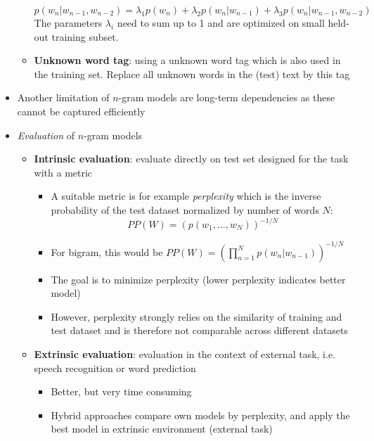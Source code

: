 \begin{itemize}
\begin{itemize}
		$$p(w_n|w_{n-1},w_{n-2}) = \lambda_1 p(w_n) + \lambda_2 p(w_n|w_{n-1}) + \lambda_3 p(w_n|w_{n-1}, w_{n-2})$$
		The parameters $\lambda_i$ need to sum up to 1 and are optimized on small held-out training subset. 
		\item \textbf{Unknown word tag}: using a unknown word tag which is also used in the training set. Replace all unknown words in the (test) text by this tag
	\end{itemize}
	\item Another limitation of $n$-gram models are long-term dependencies as these cannot be captured efficiently
	\item \textit{Evaluation} of $n$-gram models
	\begin{itemize}
		\item \textbf{Intrinsic evaluation}: evaluate directly on test set designed for the task with a metric
		\begin{itemize}
			\item A suitable metric is for example \textit{perplexity} which is the inverse probability of the test dataset normalized by number of words $N$:
			$$PP(W) = \left(p(w_1,...,w_N)\right)^{-1/N}$$
			\item For bigram, this would be $PP(W)=\left(\prod_{n=1}^{N}p(w_n|w_{n-1})\right)^{-1/N}$
			\item The goal is to minimize perplexity (lower perplexity indicates better model)
			\item However, perplexity strongly relies on the similarity of training and test dataset and is therefore not comparable across different datasets
		\end{itemize}
		\item \textbf{Extrinsic evaluation}: evaluation in the context of external task, i.e. speech recognition or word prediction
		\begin{itemize}
			\item Better, but very time consuming
			\item Hybrid approaches compare own models by perplexity, and apply the best model in extrinsic environment (external task)
		\end{itemize}
	\end{itemize}
\end{itemize}
